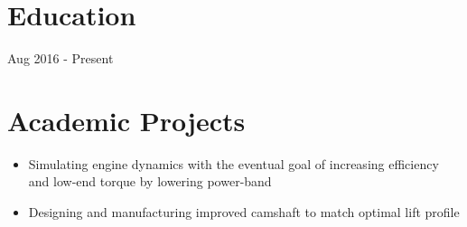 \documentclass{resume}
\begin{document}
\section{Education}
\begin{schools}{Aug 2016 - Present}
\end{schools}


\section{Academic Projects}
\begin{itemize}
  \item Simulating engine dynamics with the eventual goal of increasing efficiency and low-end torque by lowering power-band
  \item Designing and manufacturing improved camshaft to match optimal lift profile
\end{itemize}
\end{document}
